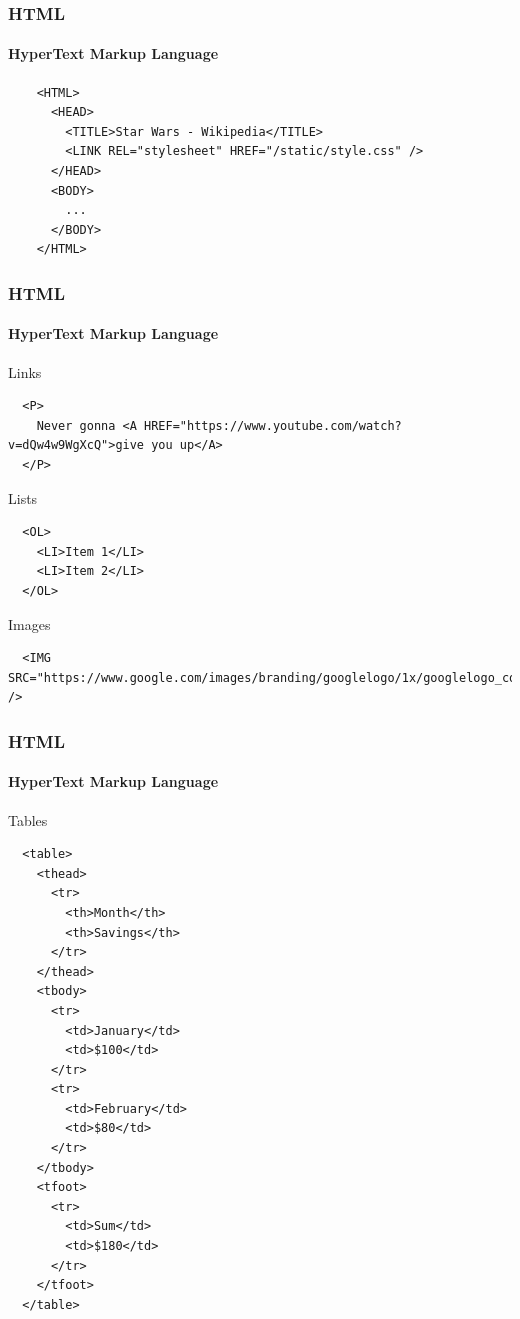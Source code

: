\documentclass[dvipsnames]{beamer}
\begin{document}
\begin{frame}[fragile=singleslide]
  \frametitle{HTML}
  \framesubtitle{HyperText Markup Language}

  \begin{Verbatim}
    <HTML>
      <HEAD>
        <TITLE>Star Wars - Wikipedia</TITLE>
        <LINK REL="stylesheet" HREF="/static/style.css" />
      </HEAD>
      <BODY>
        ...
      </BODY>
    </HTML>
  \end{Verbatim}
\end{frame}


\begin{frame}[fragile=singleslide]
  \frametitle{HTML}
  \framesubtitle{HyperText Markup Language}

  \begin{block}{Links}
    \tiny
    \begin{Verbatim}
  <P>
    Never gonna <A HREF="https://www.youtube.com/watch?v=dQw4w9WgXcQ">give you up</A>
  </P>
    \end{Verbatim}
  \end{block}

  \begin{block}{Lists}
    \tiny
    \begin{Verbatim}
  <OL>
    <LI>Item 1</LI>
    <LI>Item 2</LI>
  </OL>
    \end{Verbatim}
  \end{block}

  \begin{block}{Images}
    \tiny
    \begin{Verbatim}
  <IMG SRC="https://www.google.com/images/branding/googlelogo/1x/googlelogo_color_272x92dp.png" />
    \end{Verbatim}
  \end{block}
\end{frame}


\begin{frame}[fragile=singleslide]
  \frametitle{HTML}
  \framesubtitle{HyperText Markup Language}

  \begin{block}{Tables}
    \tiny
    \begin{Verbatim}
  <table>
    <thead>
      <tr>
        <th>Month</th>
        <th>Savings</th>
      </tr>
    </thead>
    <tbody>
      <tr>
        <td>January</td>
        <td>$100</td>
      </tr>
      <tr>
        <td>February</td>
        <td>$80</td>
      </tr>
    </tbody>
    <tfoot>
      <tr>
        <td>Sum</td>
        <td>$180</td>
      </tr>
    </tfoot>
  </table>
		\end{Verbatim}
		\end{block}
\end{frame}
\end{document}
